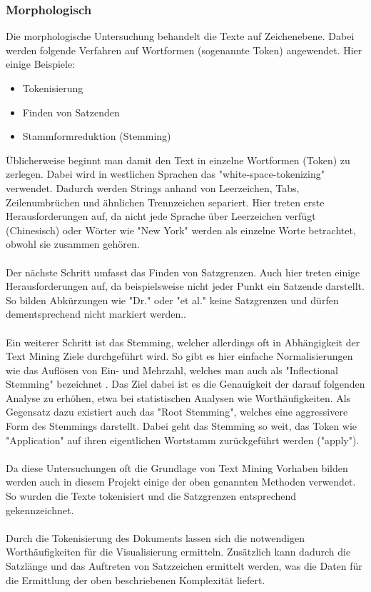 \subsubsection{Morphologisch}
Die morphologische Untersuchung behandelt die Texte auf Zeichenebene. Dabei werden folgende Verfahren auf Wortformen (sogenannte Token) angewendet. Hier einige Beispiele:\\

\begin{itemize}
	\item Tokenisierung
	\item Finden von Satzenden
	\item Stammformreduktion (Stemming)
\end{itemize}

\"Ublicherweise beginnt man damit den Text in einzelne Wortformen (Token) zu zerlegen. Dabei wird in westlichen Sprachen das "white-space-tokenizing" verwendet. Dadurch werden Strings anhand von Leerzeichen, Tabs, Zeilenumbr\"uchen und \"ahnlichen Trennzeichen separiert. Hier treten erste Herausforderungen auf, da nicht jede Sprache \"uber Leerzeichen verf\"ugt (Chinesisch) oder W\"orter wie "New York" werden als einzelne Worte betrachtet, obwohl sie zusammen geh\"oren.\\
\\
Der n\"achste Schritt umfasst das Finden von Satzgrenzen. Auch hier treten einige Herausforderungen auf, da beispielsweise nicht jeder Punkt ein Satzende darstellt. So bilden Abk\"urzungen wie "Dr." oder "et al." keine Satzgrenzen und d\"urfen dementsprechend nicht markiert werden..\\
\\
Ein weiterer Schritt ist das Stemming, welcher allerdings oft in Abh\"angigkeit der Text Mining Ziele durchgef\"uhrt wird. So gibt es hier einfache Normalisierungen wie das Aufl\"osen von Ein- und Mehrzahl, welches man auch als "Inflectional Stemming" bezeichnet \cite{Weiss}. Das Ziel dabei ist es die Genauigkeit der darauf folgenden Analyse zu erh\"ohen, etwa bei statistischen Analysen wie Worth\"aufigkeiten. Als Gegensatz dazu existiert auch das "Root Stemming", welches eine aggressivere Form des Stemmings darstellt. Dabei geht das Stemming so weit, das Token wie "Application" auf ihren eigentlichen Wortstamm zur\"uckgef\"uhrt werden ("apply").\\
\\
Da diese Untersuchungen oft die Grundlage von Text Mining Vorhaben bilden werden auch in diesem Projekt einige der oben genannten Methoden verwendet. So wurden die Texte tokenisiert und die Satzgrenzen entsprechend gekennzeichnet. \\
\\
Durch die Tokenisierung des Dokuments lassen sich die notwendigen Worth\"aufigkeiten f\"ur die Visualisierung ermitteln. Zus\"atzlich kann dadurch die Satzl\"ange und das Auftreten von Satzzeichen ermittelt werden, was die Daten f\"ur die Ermittlung der oben beschriebenen Komplexit\"at liefert.

